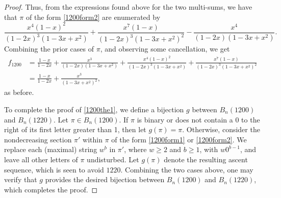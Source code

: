 \documentclass[10pt,a4paper]{amsart}
\begin{document}
\begin{proof}
Thus, from the expressions found above for the two multi-sums, we have that $\pi$ of the form \eqref{1200form2} are enumerated by
$$\frac{x^4(1-x)^2}{(1-2x)^3(1-3x+x^2)}+\frac{x^7(1-x)}{(1-2x)^3(1-3x+x^2)^2}-\frac{x^4}{(1-2x)(1-3x+x^2)}.$$
Combining the prior cases of $\pi$, and observing some cancellation, we get
\begin{align*}
f_{1200}&=\frac{1-x}{1-2x}+\frac{x^3}{(1-2x)(1-3x+x^2)}+\frac{x^4(1-x)^2}{(1-2x)^3(1-3x+x^2)}+\frac{x^7(1-x)}{(1-2x)^3(1-3x+x^2)^2}\\
&=\frac{1-x}{1-2x}+\frac{x^3}{(1-3x+x^2)^2},
\end{align*}
as before.

To complete the proof of \eqref{1200the1}, we define a bijection $g$ between $B_n(1200)$ and $B_n(1220)$.  Let $\pi \in B_n(1200)$.  If $\pi$ is binary or does not contain a 0 to the right of its first letter greater than 1, then let $g(\pi)=\pi$.  Otherwise, consider the nondecreasing section $\pi'$ within $\pi$ of the form \eqref{1200form1} or \eqref{1200form2}.  We replace each (maximal) string $w^b$ in $\pi'$, where $w \geq 2$ and $b \geq 1$, with $w0^{b-1}$, and leave all other letters of $\pi$ undisturbed.  Let $g(\pi)$ denote the resulting ascent sequence, which is seen to avoid $1220$.  Combining the two cases above, one may verify that $g$ provides the desired bijection between $B_n(1200)$ and $B_n(1220)$, which completes the proof.
\end{proof}
\end{document}
